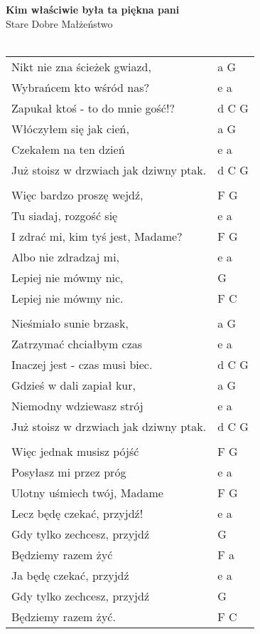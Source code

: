 \documentclass[a5paper]{article}
\begin{document}


\noindent
\fontsize{12pt}{15pt}\selectfont
\textbf{Kim właściwie była ta piękna pani} \\
\fontsize{8pt}{10pt}\selectfont
Stare Dobre Małżeństwo \\ \\
\fontsize{10pt}{12pt}\selectfont
{}
\begin{tabular}{@{}p{8.50cm}p{3cm}@{}}
\noindent
Nikt nie zna ścieżek gwiazd, & a G \\
Wybrańcem kto wśród nas? & e a \\
Zapukał ktoś - to do mnie gość!? & d C G \\
Włóczyłem się jak cień, & a G \\
Czekałem na ten dzień & e a \\
Już stoisz w drzwiach jak dziwny ptak. & d C G \\ \\

Więc bardzo proszę wejdź, & F G \\
Tu siadaj, rozgość się & e a \\
I zdrać mi, kim tyś jest, Madame? & F G \\
Albo nie zdradzaj mi, & e a \\
Lepiej nie mówmy nic, & G \\
Lepiej nie mówmy nic. & F C \\ \\

Nieśmiało sunie brzask, & a G \\
Zatrzymać chciałbym czas & e a\\
Inaczej jest - czas musi biec. & d C G\\
Gdzieś w dali zapiał kur, & a G\\
Niemodny wdziewasz strój & e a\\
Już stoisz w drzwiach jak dziwny ptak. & d C G\\ \\

Więc jednak musisz pójść & F G \\
Posyłasz mi przez próg & e a \\
Ulotny uśmiech twój, Madame & F G \\
Lecz będę czekać, przyjdź! & e a \\
Gdy tylko zechcesz, przyjdź & G \\
Będziemy razem żyć & F a \\
Ja będę czekać, przyjdź & e a \\
Gdy tylko zechcesz, przyjdź	& G \\
Będziemy razem żyć.	& F C
\end{tabular}
\end{document}
